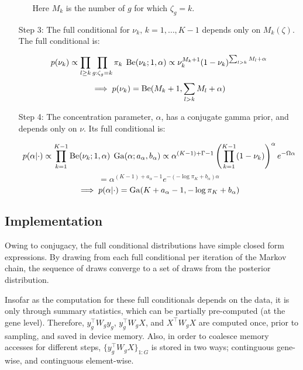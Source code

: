 \begin{enumerate}
\begin{enumerate}
    Here $M_k$ is the number of $g$ for which $\zeta_g = k$. 
  \end{enumerate}
\item[Step 3:] The full conditional for $\nu_k,\,k=1,\ldots,K-1$ depends only on $M_k(\zeta)$. The full conditional is:

  \begin{equation}
    p(\nu_k) \propto \prod_{l \ge k} \prod_{g:\zeta_g=k} \pi_k \; \operatorname{Be}(\nu_k; 1, \alpha) \propto \nu_k^{M_k + 1}(1-\nu_k)^{\sum_{l > k} M_l + \alpha} 
  \end{equation}
  \begin{equation*}
    \implies p(\nu_k)=\operatorname{Be}(M_k + 1, \sum_{l>k}M_l + \alpha)
  \end{equation*}
\item[Step 4:]
  The concentration parameter, $\alpha$, has a conjugate gamma prior, and depends only on $\nu$. Its full conditional is:

  \begin{equation}
    p(\alpha|\cdot) \propto \prod_{k=1}^{K-1} \operatorname{Be}(\nu_k;1, \alpha) \; \operatorname{Ga}(\alpha;a_\alpha,b_\alpha)
\propto \alpha^{(K-1) + \Gamma - 1} \left(\prod_{k=1}^{K-1} (1-\nu_k)\right)^\alpha e^{-\Omega \alpha} 
  \end{equation}
  \begin{equation*}
    = \alpha^{(K-1) + a_\alpha - 1} e^{-(-\log \pi_K + b_\alpha) \alpha}
  \end{equation*}
  \begin{equation*}
    \implies p(\alpha|\cdot) = \operatorname{Ga}(K + a_\alpha - 1, -\log \pi_K + b_\alpha)
  \end{equation*}
\end{enumerate}

\subsection{Implementation}
\label{subsec:implement}
Owing to conjugacy, the full conditional distributions have simple closed form expressions. By drawing from each full conditional per iteration of the Markov chain, the sequence of draws converge to a set of draws from the posterior distribution.

Insofar as the computation for these full conditionals depends on the data, it is only through summary statistics, which can be partially pre-computed (at the gene level). Therefore, $y_g^\top W_g y_g$, $y_g^\top W_g X$, and $X^\top W_g X$ are computed once, prior to sampling, and saved in device memory. Also, in order to coalesce memory accesses for different steps, $\{y_g^\top W_g X\}_{1:G}$ is stored in two ways; continguous gene-wise, and continguous
element-wise.

